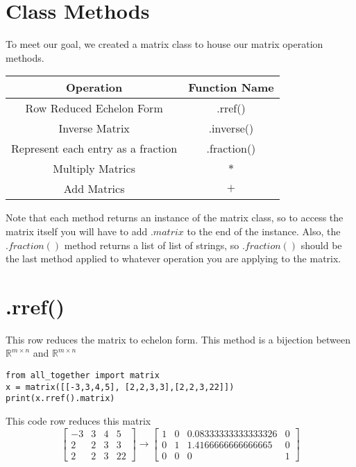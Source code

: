 \documentclass{article}
\begin{document}
\section{Class Methods}
To meet our goal, we created a matrix class to house our matrix operation methods. 
\begin{center}
\begin{tabular}{||c|c||}
    \hline
    Operation & Function Name \\ [0.5ex]
    \hline\hline
    Row Reduced Echelon Form & .rref() \\
    Inverse Matrix & .inverse() \\
    Represent each entry as a fraction & .fraction() \\
    Multiply Matrics & \(*\) \\
    Add Matrics & \(+\) \\ [1ex]
    \hline 
\end{tabular}
\end{center}
Note that each method returns an instance of the matrix class, so to access the matrix itself you will have to add \(.matrix\) to the end of the instance. 
Also, the \(.fraction()\) method returns a list of list of strings, so \(.fraction()\) should be the last method applied to whatever operation you are applying to the
matrix. 

\section{.rref()}
This row reduces the matrix to echelon form. This method is a bijection between \(\mathbb{R}^{m \times n}\) and \(\mathbb{R}^{m \times n}\)
\begin{lstlisting}
from all_together import matrix
x = matrix([[-3,3,4,5], [2,2,3,3],[2,2,3,22]])
print(x.rref().matrix) 
\end{lstlisting}
This code row reduces this matrix 
\begin{equation}
\left[
\begin{array}{cccc}
    -3 & 3 & 4 &5   \\
     2&2&3&3 \\
     2&2&3&22
\end{array}
\right]
\rightarrow
\left[
\begin{array}{cccc}
    1 & 0 & 0.08333333333333326 &0   \\
     0&1& 1.4166666666666665&0 \\
     0&0&0&1
\end{array}
\right]
\end{equation}
\end{document}
